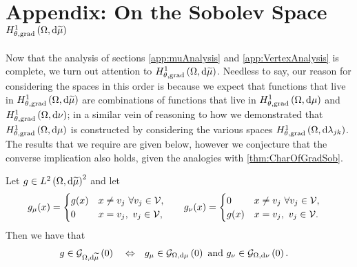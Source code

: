 \section{Appendix: On the Sobolev Space $H^1_{\theta, \mathrm{grad}}\left( \Omega, \mathrm{d}\widetilde{\mu} \right)$} \label{app:SumMeasureAnalysis}
Now that the analysis of sections \ref{app:muAnalysis} and \ref{app:VertexAnalysis} is complete, we turn out attention to $H^1_{\theta, \mathrm{grad}}\left( \Omega, \mathrm{d}\widetilde{\mu} \right)$.
Needless to say, our reason for considering the spaces in this order is because we expect that functions that live in $H^1_{\theta, \mathrm{grad}}\left( \Omega, \mathrm{d}\widetilde{\mu} \right)$ are combinations of functions that live in $H^1_{\theta, \mathrm{grad}}\left( \Omega, \mathrm{d}\mu \right)$ and $H^1_{\theta, \mathrm{grad}}\left( \Omega, \mathrm{d}\nu \right)$; in a similar vein of reasoning to how we demonstrated that $H^1_{\theta, \mathrm{grad}}\left( \Omega, \mathrm{d}\mu \right)$ is constructed by considering the various spaces $H^1_{\theta, \mathrm{grad}}\left( \Omega, \mathrm{d}\lambda_{jk} \right)$.
The results that we require are given below, however we conjecture that the converse implication also holds, given the analogies with \ref{thm:CharOfGradSob}.
\begin{prop} \label{prop:ThickVertexGradZeroIFF}
	Let $g\in L^{2}\left( \Omega,\mathrm{d}\widetilde{\mu} \right)^2$ and let 
	\begin{align*}
		g_{\mu}(x) = \begin{cases} g(x) & x\neq v_j \ \forall v_j\in\mathcal{V}, \\ 0 & x=v_j, \ v_j\in\mathcal{V}, \end{cases} 
		&\qquad
		g_{\nu}(x) = \begin{cases} 0 & x\neq v_j \ \forall v_j\in\mathcal{V}, \\ g(x) & x=v_j, \ v_j\in\mathcal{V}. \end{cases}
	\end{align*}		
	Then we have that
	\begin{align*}
		g\in\mathcal{G}_{ \Omega, \mathrm{d}\widetilde{\mu}}\left( 0 \right) \quad\Leftrightarrow\quad 
		& g_{\mu}\in\mathcal{G}_{ \Omega, \mathrm{d}\mu}\left( 0 \right) \text{ and } g_{\nu}\in\mathcal{G}_{ \Omega, \mathrm{d}\nu}\left( 0 \right).
	\end{align*}
\end{prop}
